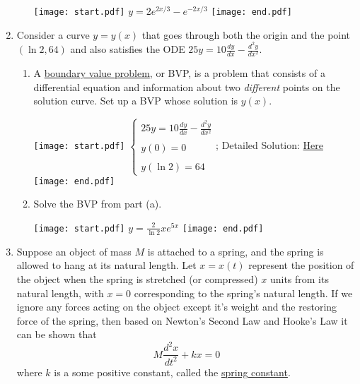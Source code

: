 \documentclass[12pt]{article}
\begin{document}
\begin{enumerate}
\begin{enumerate}
\texttt{[image: start.pdf]}
{{$y=2e^{2x/3}-e^{-2x/3}$}}
\texttt{[image: end.pdf]}


\end{enumerate}

\item Consider a curve $y=y(x)$ that goes through both the origin and the point $\left(\ln{2},64\right)$ and also satisfies the ODE $25y=10\frac{dy}{dx}-\frac{d^2y}{dx^2}$.

\begin{enumerate}

\item A \underline{boundary value problem}, or BVP, is a problem that consists of a differential equation and information about two \emph{different} points on the solution curve.   \newline
Set up a BVP whose solution is $y(x)$.

\texttt{[image: start.pdf]}
{{$\left\{\begin{array}{l}
 25y=10\frac{dy}{dx}-\frac{d^2y}{dx^2}
\\ \\
y(0)=0
\\ \\
y(\ln{2})=64
\end{array}\right.$; Detailed Solution: \textcolor{blue}{\href{http://www.math.drexel.edu/classes/Calculus/resources/Math123HW/Solutions/123_04_Second_Order_ODEs_14.pdf}{Here}}}}
\texttt{[image: end.pdf]}


\item Solve the BVP from part (a).

\texttt{[image: start.pdf]}
{{$y=\frac{2}{\ln{2}}xe^{5x}$}}
\texttt{[image: end.pdf]}


\end{enumerate}

\item Suppose an object of mass $M$ is attached to a spring, and the spring is allowed to hang at its natural length.  Let $x=x(t)$ represent the position of the object when the spring is stretched (or compressed)
$x$ units from its natural length, with $x=0$ corresponding to the spring's natural length.  If we ignore any forces acting on the object except it's weight and the restoring force of the spring, then based on Newton's
Second Law and Hooke's Law it can be shown that $$M\frac{d^2x}{dt^2}+kx=0$$ where $k$ is a some positive constant, called the \underline{spring constant}.


\end{enumerate}
\end{document}
